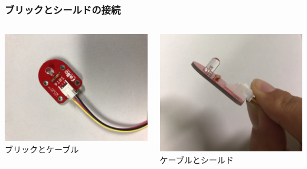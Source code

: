 \begin{frame}
    \frametitle{ブリックとシールドの接続} 
    \begin{columns}
        \begin{column}{0.48\textwidth}
            \includegraphics[width=\textwidth]{images/chap05/text05-img008.jpg} 
            {ブリックとケーブル}
        \end{column}
        \begin{column}{0.48\textwidth}
            \includegraphics[width=\textwidth]{images/chap05/text05-img011.jpg} 
            {ケーブルとシールド}
        \end{column}
    \end{columns}
\end{frame}

